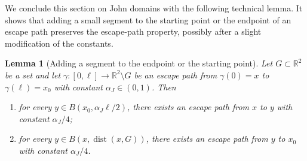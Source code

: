\documentclass[12pt]{article}
\newtheorem{lemma}[theorem]{Lemma}
\theoremstyle{definition}
\theoremstyle{remark}
\numberwithin{equation}{section}
\DeclareMathOperator{\dist}{dist}
\newcommand{\R}{\mathbb{R}}
\begin{document}

We conclude this section on John domains with the following technical lemma. It shows that adding a small segment to the starting point or the endpoint of an escape path preserves the escape-path property, possibly after a slight modification of the constants.



\begin{lemma}[Adding a segment to the endpoint or the starting point]
    \label{LemmaJohnSegment}
    Let $G\subset \R^2$ be a set and let $\gamma \colon [0,\ell] \longrightarrow \R^2 \setminus G$ be an escape path from  $\gamma(0) = x$ to $\gamma(\ell)=x_0$ with constant $\alpha_J \in (0,1)$. Then
    \begin{enumerate}[label=(\arabic*)]
        \item for every  $y \in B(x_0, \alpha_J \ell/2)$, there exists an escape path from $x$ to $y$ with constant
            $\alpha_J/4$;
        \item for every $y\in B(x, \dist(x,G))$, there exists an escape path from $y$ to $x_0$ with constant $\alpha_J/4$. 
    \end{enumerate}
\end{lemma}
\end{document}
